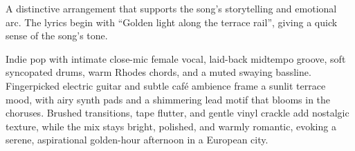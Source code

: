 

\begin{notes}
A distinctive arrangement that supports the song's storytelling and emotional arc. %
The lyrics begin with “Golden light along the terrace rail”, giving a quick sense of the song’s tone.
\end{notes}

\begin{style}
Indie pop with intimate close-mic female vocal, laid-back midtempo groove, soft syncopated drums, warm Rhodes chords, and a muted swaying bassline. %
Fingerpicked electric guitar and subtle café ambience frame a sunlit terrace mood, with airy synth pads and a shimmering lead motif that blooms in the choruses. %
Brushed transitions, tape flutter, and gentle vinyl crackle add nostalgic texture, while the mix stays bright, polished, and warmly romantic, evoking a serene, aspirational golden-hour afternoon in a European city.
\end{style}

